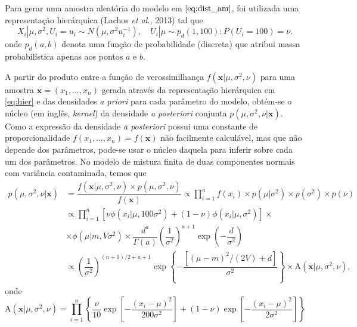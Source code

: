 Para gerar uma amostra aleatória do modelo em $\eqref{eq:dist_am}$, foi utilizada uma representação hierárquica (Lachos \textit{et al.}, 2013)\cite{Lachos2013} tal que
\begin{equation}
X_i | \mu, \sigma^2, U_{i} = u_i \sim{N}(\mu, \sigma^2 u_i^{-1}), \quad U_i | \mu \sim{p_d}(1,100) : P(U_i = 100) = \nu. \label{eq:hier}
\end{equation}
\noindent onde $p_d(a,b)$ denota uma função de probabilidade (discreta) que atribui massa probabilística apenas aos pontos $a$ e $b$.

A partir do produto entre a função de verossimilhança $f(\bm{x} | \mu, \sigma^2, \nu)$ para uma amostra $\bm{x} = (x_1, \ldots, x_n)$ gerada através da representação hierárquica em \eqref{eq:hier} e das densidades \textit{a priori} para cada parâmetro do modelo, obtém-se o núcleo (em inglês, \textit{kernel}) da densidade \textit{a posteriori} conjunta $p(\mu, \sigma^2, \nu | \bm{x})$. Como a expressão da densidade \textit{a posteriori} possui uma constante de proporcionalidade $f(x_1, \ldots, x_n) = f(\bm{x})$ não facilmente calculável, mas que não depende dos parâmetros, pode-se usar o núcleo daquela para inferir sobre cada um dos parâmetros. No modelo de mistura finita de duas componentes normais com variância contaminada, temos que
\begin{align}
p(\mu, \sigma^2, \nu | \bm{x})
&= \dfrac{f(\bm{x} | \mu, \sigma^2, \nu) \times p(\mu, \sigma^2, \nu)}{f(\bm{x})} \propto \prod_{i=1}^{n} f(x_i) \times p(\mu | \sigma^2) \times p(\sigma^2) \times p(\nu) \nonumber\\
&\propto \prod_{i=1}^{n} \left[ \nu \phi(x_i | \mu, 100 \sigma^2) + (1 - \nu) \phi(x_i | \mu, \sigma^2) \right] \times \nonumber \\
&\times \phi(\mu | m, V \sigma^2) \times \dfrac{d^a}{\Gamma(a)} \left(\dfrac{1}{\sigma^2}\right)^{a + 1} \exp\left(-\dfrac{d}{\sigma^2}\right) \nonumber \\
&\propto \left(\dfrac{1}{\sigma^2}\right)^{(n + 1)/2 + a + 1} \exp\left\{-\dfrac{\left[(\mu - m)^2 / (2V) + d\right]}{\sigma^2}\right\} \times \textrm{A}(\bm{x} | \mu, \sigma^2, \nu), \label{eq:dist_post}
\end{align}
onde
\begin{equation*}
\textrm{A}(\bm{x} | \mu, \sigma^2, \nu) = \prod_{i=1}^{n} \left\{  \dfrac{\nu}{10} \exp\left[-\dfrac{(x_i - \mu)^2}{200\sigma^2}\right] + (1 - \nu) \exp\left[-\dfrac{(x_i - \mu)^2}{2\sigma^2}\right] \right\}
\end{equation*}

